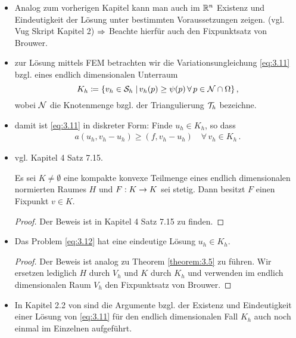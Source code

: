 \begin{itemize}
\item Analog zum vorherigen Kapitel kann man auch im $\mathbb{R}^n$ Existenz und Eindeutigkeit der Lösung unter bestimmten Voraussetzungen zeigen. (vgl. Vug Skript Kapitel 2) $\Rightarrow$ Beachte hierfür auch den Fixpunktsatz von Brouwer.

\item zur Lösung mittels FEM betrachten wir die Variationsungleichung \eqref{eq:3.11} bzgl. eines endlich dimensionalen Unterraum
\[
	K_h \coloneqq \{v_h \in \mathcal S_h \;\vert\, v_h (p) \ge \psi(p) \, \forall \, p \in \mathcal N \cap \Omega\}\, ,
\]
wobei $\mathcal N$ die Knotenmenge bzgl. der Triangulierung $\mathcal T_h$ bezeichne.

\item damit ist \eqref{eq:3.11} in diskreter Form: Finde $u_h \in K_h$, so dass
\begin{align}\label{eq:3.12}
	a(u_h,v_h-u_h) \ge (f,v_h-u_h) \quad \forall \, v_h \in K_h \, .
\end{align}

\item vgl. \cite{Werner} Kapitel 4 Satz 7.15.
\begin{satz}
Es sei $K \not= \emptyset$ eine kompakte konvexe Teilmenge eines endlich dimensionalen normierten Raumes $H$ und $F: K \rightarrow K$ sei stetig. Dann besitzt $F$ einen Fixpunkt $v \in K$.
\end{satz}

\begin{proof}
Der Beweis ist in \cite{Werner} Kapitel 4 Satz 7.15 zu finden.
\end{proof}

\item \begin{theorem}
Das Problem \eqref{eq:3.12} hat eine eindeutige Lösung $u_h \in K_h$.
\end{theorem}

\begin{proof}
Der Beweis ist analog zu Theorem \ref{theorem:3.5} zu führen. Wir ersetzen lediglich $H$ durch $V_h$ und $K$ durch $K_h$ und verwenden im endlich dimensionalen Raum $V_h$ den Fixpunktsatz von Brouwer.
\end{proof}

\item \begin{bem*}
In Kapitel 2.2 von \cite{StarkePDE} sind die Argumente bzgl. der Existenz und Eindeutigkeit einer Lösung von \eqref{eq:3.11} für den endlich dimensionalen Fall $K_h$ auch noch einmal im Einzelnen aufgeführt.
\end{bem*}


\end{itemize}
